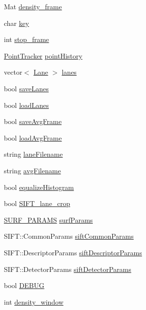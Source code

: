 \begin{DoxyCompactItemize}
\-Mat \hyperlink{class_options_a0f0729b7b9d38b511319f89b7daec944}{density\-\_\-frame}
\item 
char \hyperlink{class_options_aca9c5b9267460a683e2f9ef45f6aaf74}{key}
\item 
int \hyperlink{class_options_a45c792c3812d45288b199e7eb8f74400}{stop\-\_\-frame}
\item 
\hyperlink{class_point_tracker}{\-Point\-Tracker} \hyperlink{class_options_af83140b97a9529d40535a4faac829326}{point\-History}
\item 
vector$<$ \hyperlink{class_lane}{\-Lane} $>$ \hyperlink{class_options_a965c30864fffe291850b3a68834150ea}{lanes}
\item 
bool \hyperlink{class_options_abbb026b8b9eb99f147913912e6a8b1b9}{save\-Lanes}
\item 
bool \hyperlink{class_options_a07cdcfd5edc191ee49ad01c71688789a}{load\-Lanes}
\item 
bool \hyperlink{class_options_a72803ea5d520c02502a72885fc1d7d00}{save\-Avg\-Frame}
\item 
bool \hyperlink{class_options_a3a89b79a7b1e423ba934990b182fd887}{load\-Avg\-Frame}
\item 
string \hyperlink{class_options_a635b111055e083a91f228feff6fee1fc}{lane\-Filename}
\item 
string \hyperlink{class_options_a3c468be8f4b636ea332fcacac909ee4b}{avg\-Filename}
\item 
bool \hyperlink{class_options_af486b12e9d1b38aabcb1dd43a3c1e793}{equalize\-Histogram}
\item 
bool \hyperlink{class_options_a6c6a59d771c1212823ab5f8ff3852bc8}{\-S\-I\-F\-T\-\_\-lane\-\_\-crop}
\item 
\hyperlink{class_s_u_r_f___p_a_r_a_m_s}{\-S\-U\-R\-F\-\_\-\-P\-A\-R\-A\-M\-S} \hyperlink{class_options_ad1d83ecaa7c69b9b49e949c4c2f7077a}{surf\-Params}
\item 
\-S\-I\-F\-T\-::\-Common\-Params \hyperlink{class_options_a63c080ac129b8c92ba3cdc9ca07250de}{sift\-Common\-Params}
\item 
\-S\-I\-F\-T\-::\-Descriptor\-Params \hyperlink{class_options_a59c9196b898a79ecdda3599f932aba43}{sift\-Descriptor\-Params}
\item 
\-S\-I\-F\-T\-::\-Detector\-Params \hyperlink{class_options_ae1ba0a4c219005ee896951f047852f12}{sift\-Detector\-Params}
\item 
bool \hyperlink{class_options_a22414840e13de871e6182c2b0781ae5b}{\-D\-E\-B\-U\-G}
\item 
int \hyperlink{class_options_adbdf2cb66ca801f754de4299fb6e499a}{density\-\_\-window}
\end{DoxyCompactItemize}


